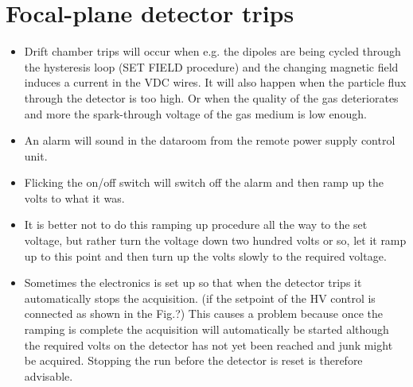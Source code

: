 \documentclass[11pt]{report}
\begin{document}







\section{Focal-plane detector trips}

\begin{itemize}
\item Drift chamber trips will occur when e.g. the dipoles are
being cycled through the hysteresis loop (SET FIELD procedure)
and the changing magnetic field induces a current in the VDC wires.
It will also happen when the particle flux through the detector
is too high. Or when the quality of the gas deteriorates and
more the spark-through voltage of the gas medium is low enough.
\item  An alarm will sound in the dataroom from the remote power supply
control unit.
\item  Flicking the on/off switch will switch off the alarm and then ramp
up the volts to what it was.
\item  It is better not to do this ramping up procedure all the way to the 
set voltage, but rather turn the voltage down two hundred volts or so, let
it ramp up to this point and then turn up the volts slowly to the required 
voltage.
\item Sometimes the electronics is set up so that when the detector trips 
it automatically stops the acquisition.
(if the setpoint of the HV control is connected as shown in the Fig.?)
This causes a problem because once the ramping is complete the 
acquisition will automatically be started although the required volts on 
the detector has not yet been reached and junk might be acquired. Stopping 
the run before the detector is reset is therefore advisable.
\end{itemize}
\end{document}
